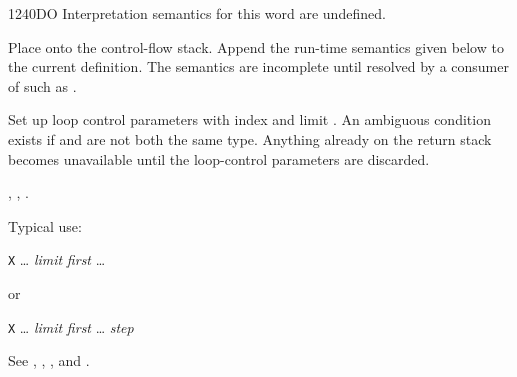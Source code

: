 \begin{worddef}{1240}{DO}
\interpret
	Interpretation semantics for this word are undefined.

\compile

	Place  onto the control-flow stack. Append the
	run-time semantics given below to the current definition. The
	semantics are incomplete until resolved by a consumer of
	 such as .

\runtime

	Set up loop control parameters with index  and
	limit . An ambiguous condition exists if
	 and  are not both the same
	type. Anything already on the return stack becomes unavailable
	until the loop-control parameters are discarded.

\see {},
	,
	.

	\begin{defer}
	\rationale %
		Typical use:

		\tab \word{:} \texttt{X} {\ldots}
			\emph{limit} \emph{first} 
				{\ldots}
		\word{;}

		or

		\tab \word{:} \texttt{X} {\ldots}
			\emph{limit} \emph{first} 
				{\ldots}
			\emph{step} 
		\word{;}

	\testing
		\rmfamily
		See ,
			,
			,
			 and
			.
	\end{defer}
\end{worddef}


